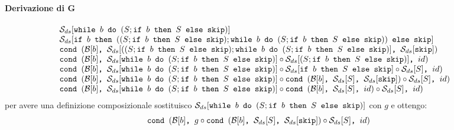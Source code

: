 {\paragraph{Derivazione di G}
$$
\begin{array}{ll}
\dsCtxt{\wbS{b}{(S; \ifABC{b}{S}{\skipForFriends})}} & \\
\dsCtxt{\ifABC{b}{((S;  \ifABC{b}{S}{\skipForFriends}); \wbS{b}{(S; \ifABC{b}{S}{\skipForFriends})} )}{\skipForFriends}} & \\
\cond{b}{\dsCtxt{((S;  \ifABC{b}{S}{\skipForFriends}); \wbS{b}{(S; \ifABC{b}{S}{\skipForFriends})}}}{\dsCtxt{\skipForFriends}} \\
\cond{b}{\dsCtxt{\wbS{b}{(S; \ifABC{b}{S}{\skipForFriends})}} \circ \dsCtxt{(S;  \ifABC{b}{S}{\skipForFriends})}}{id} & \\
\cond{b}{\dsCtxt{\wbS{b}{(S; \ifABC{b}{S}{\skipForFriends})}} \circ \dsCtxt{\ifABC{b}{S}{\skipForFriends}} \circ \dsCtxt{S} }{id} & \\
\cond{b}{\dsCtxt{\wbS{b}{(S; \ifABC{b}{S}{\skipForFriends})}} \circ \cond{b}{\dsCtxt{S}}{\dsCtxt{\skipForFriends}} \circ \dsCtxt{S} }{id} & \\
\cond{b}{\dsCtxt{\wbS{b}{(S; \ifABC{b}{S}{\skipForFriends})}} \circ \cond{b}{\dsCtxt{S}}{id} \circ \dsCtxt{S} }{id} & \\
\end{array}
$$
per avere una definizione composizionale sostituisco $\dsCtxt{\wbS{b}{(S; \ifABC{b}{S}{\skipForFriends})}} $ con $g$ e ottengo:
$$
\cond{b}{g \circ \cond{b}{\dsCtxt{S}}{\dsCtxt{\skipForFriends}} \circ \dsCtxt{S} }{id}
$$
}